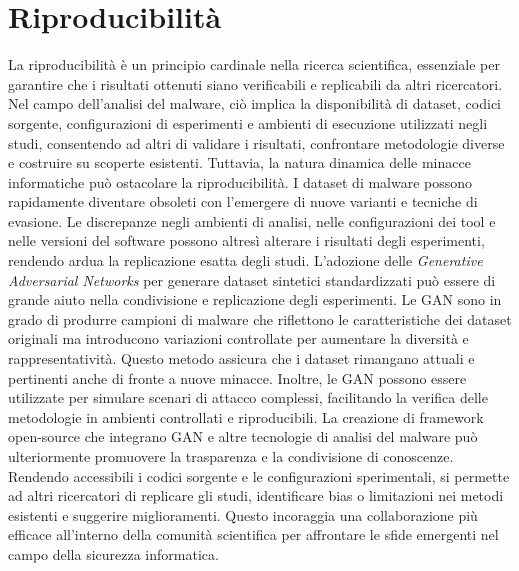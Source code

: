 \section{Riproducibilità}
La riproducibilità è un principio cardinale nella ricerca scientifica, essenziale per garantire che i risultati ottenuti siano verificabili e replicabili da altri ricercatori. Nel campo dell'analisi del malware, ciò implica la disponibilità di dataset, codici sorgente, configurazioni di esperimenti e ambienti di esecuzione utilizzati negli studi, consentendo ad altri di validare i risultati, confrontare metodologie diverse e costruire su scoperte esistenti.
Tuttavia, la natura dinamica delle minacce informatiche può ostacolare la riproducibilità. I dataset di malware possono rapidamente diventare obsoleti con l'emergere di nuove varianti e tecniche di evasione. Le discrepanze negli ambienti di analisi, nelle configurazioni dei tool e nelle versioni del software possono altresì alterare i risultati degli esperimenti, rendendo ardua la replicazione esatta degli studi.
L'adozione delle \emph{Generative Adversarial Networks} per generare dataset sintetici standardizzati può essere di grande aiuto nella condivisione e replicazione degli esperimenti. Le GAN sono in grado di produrre campioni di malware che riflettono le caratteristiche dei dataset originali ma introducono variazioni controllate per aumentare la diversità e rappresentatività. Questo metodo assicura che i dataset rimangano attuali e pertinenti anche di fronte a nuove minacce. Inoltre, le GAN possono essere utilizzate per simulare scenari di attacco complessi, facilitando la verifica delle metodologie in ambienti controllati e riproducibili.
La creazione di framework open-source che integrano GAN e altre tecnologie di analisi del malware può ulteriormente promuovere la trasparenza e la condivisione di conoscenze. Rendendo accessibili i codici sorgente e le configurazioni sperimentali, si permette ad altri ricercatori di replicare gli studi, identificare bias o limitazioni nei metodi esistenti e suggerire miglioramenti. Questo incoraggia una collaborazione più efficace all'interno della comunità scientifica per affrontare le sfide emergenti nel campo della sicurezza informatica.


